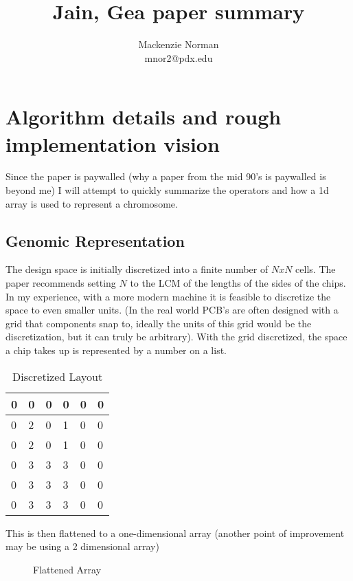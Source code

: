\documentclass{article}
\title{Jain, Gea paper summary}
\author{Mackenzie Norman\\ mnor2@pdx.edu}
\begin{document}
\maketitle

\section{Algorithm details and rough implementation vision}
Since the paper is paywalled (why a paper from the mid 90's is paywalled is beyond me) I will attempt to quickly summarize the operators and how a 1d array is used to represent a chromosome. 

\subsection{Genomic Representation}
The design space is initially discretized into a finite number of $ N x N $ cells. The paper recommends setting $N$ to the LCM of the lengths of the sides of the chips. In my experience, with a more modern machine it is feasible to discretize the space to even smaller units. (In the real world PCB's are often designed with a grid that components snap to, ideally the units of this grid would be the discretization, but it can truly be arbitrary). With the grid discretized, the space a chip takes up is represented by a number on a list. 

\begin{table}[ht]
    \centering
\begin{tabular}{|l|l|l|l|l|l|}
\hline
0 & 0 & 0 & 0 & 0 & 0 \\ \hline
0 & 2 & 0 & 1 & 0 & 0 \\ \hline
0 & 2 & 0 & 1 & 0 & 0 \\ \hline
0 & 3 & 3 & 3 & 0 & 0 \\ \hline
0 & 3 & 3 & 3 & 0 & 0 \\ \hline
0 & 3 & 3 & 3 & 0 & 0 \\ \hline
\end{tabular}

\caption{Discretized Layout}
\end{table}

This is then flattened to a one-dimensional array (another point of improvement may be using a 2 dimensional array)

\begin{figure}[ht]
    \centering
    [0,0,0,0,0,0,0,2,0,1,0,0,0,2,0,1,0,0,0,3,3,3,0,0,0,3,3,3,0,0,0,3,3,3,0,0]
    
    \caption{Flattened Array }
    \label{fig:enter-label}
\end{figure}
\end{document}
